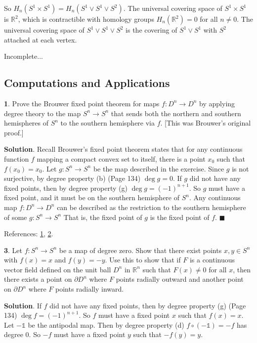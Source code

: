 \documentclass{article}
\newcommand{\R}{\mathbb{R}}
\newcommand{\identity}{\mathds{1}}
\begin{document}
So $H_{n}(S^{1}\times S^{1}) = H_{n}(S^{1}\vee S^{1}\vee S^{2})$. The universal covering space of $S^{1}\times S^{1}$ is $\R^{2}$, which is contractible with homology groups $H_{n}(\R^{2}) = 0$ for all $n\neq 0$. The universal covering space of $S^{1}\vee S^{1}\vee S^{2}$ is the covering of $S^{1}\vee S^{1}$ with $S^{2}$ attached at each vertex.
\medskip

Incomplete...
\bigskip
\bigskip

\subsection{Computations and Applications}

\tab\textbf{1}. Prove the Brouwer fixed point theorem for maps $f:D^{n}\to D^{n}$ by applying degree theory to the map $S^{n}\to S^{n}$ that sends both the northern and southern hemispheres of $S^{n}$ to the southern hemisphere via $f$. [This was Brouwer's original proof.]
\medskip

\textbf{Solution}. Recall Brouwer's fixed point theorem states that for any continuous function $f$ mapping a compact convex set to itself, there is a point $x_{0}$ such that $f(x_{0}) = x_{0}$. Let $g: S^{n}\to S^{n}$ be the map described in the exercise. Since $g$ is not surjective, by degree property (b) (Page 134) $\deg g = 0$. If $g$ did not have any fixed points, then by degree property (g) $\deg g = (-1)^{n+1}$. So $g$ must have a fixed point, and it must be on the southern hemisphere of $S^{n}$. Any continuous map $f:D^{n}\to D^{n}$ can be described as the restriction to the southern hemisphere of some $g: S^{n}\to S^{n}$  That is, the fixed point of $g$ is the fixed point of $f$. $\blacksquare$
\medskip

References: \href{https://en.wikipedia.org/wiki/Brouwer_fixed-point_theorem}{1}, \href{https://pages.uoregon.edu/njp/635hw4solutions.pdf}{2}.
\bigskip
\bigskip

\textbf{3}. Let $f:S^{n}\to S^{n}$ be a map of degree zero. Show that there exist points $x, y\in S^{n}$ with $f(x) = x$ and $f(y) = -y$. Use this to show that if $F$ is a continuous vector field defined on the unit ball $D^{n}$ in $\R^{n}$ such that $F(x)\neq 0$ for all $x$, then there exists a point on $\partial D^{n}$ where $F$ points radially outward and another point on $\partial D^{n}$ where $F$ points radially inward.
\medskip

\textbf{Solution}. If $f$ did not have any fixed points, then by degree property (g) (Page 134) $\deg f = (-1)^{n+1}$. So $f$ must have a fixed point $x$ such that $f(x) = x$. Let $-\identity$ be the antipodal map. Then by degree property (d) $f\circ (-\identity) = -f$ has degree 0. So $-f$ must have a fixed point $y$ such that $-f(y) = y$.
\medskip
\end{document}
